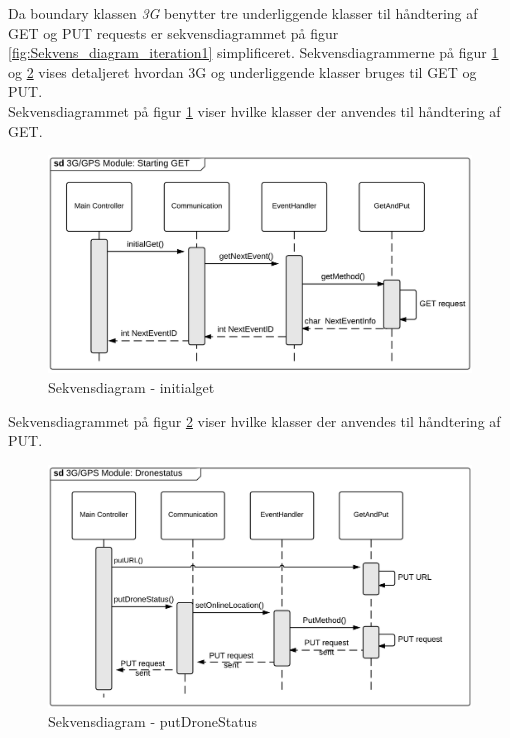 Da boundary klassen \textit{3G} benytter tre underliggende klasser til håndtering af GET og PUT requests er sekvensdiagrammet på figur \ref{fig:Sekvens_diagram_iteration1} simplificeret. Sekvensdiagrammerne på figur \ref{fig:Sekvens_diagram_initialget} og \ref{fig:Sekvens_diagram_putDroneStatus} vises detaljeret hvordan 3G og underliggende klasser bruges til GET og PUT. \\

Sekvensdiagrammet på figur \ref{fig:Sekvens_diagram_initialget} viser hvilke klasser der anvendes til håndtering af GET. 

\begin{figure}[H]
	\centering
	\includegraphics[width=1\textwidth]{Billeder/sekvens/sekvens_iteration1_initialget}
	\caption{Sekvensdiagram - initialget}
	\label{fig:Sekvens_diagram_initialget}
\end{figure}

\vspace{.5cm}

Sekvensdiagrammet på figur \ref{fig:Sekvens_diagram_putDroneStatus} viser hvilke klasser der anvendes til håndtering af PUT. 

\begin{figure}[H]
	\centering
	\includegraphics[width=1\textwidth]{Billeder/sekvens/sekvens_iteration1_putdronestatus}
	\caption{Sekvensdiagram - putDroneStatus}
	\label{fig:Sekvens_diagram_putDroneStatus}
\end{figure}


